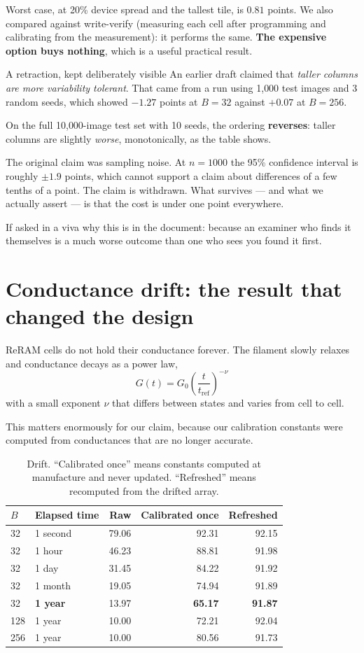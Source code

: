 \documentclass[11pt,a4paper]{report}
\begin{document}
Worst case, at 20\% device spread and the tallest tile, is $0.81$ points. We
also compared against write-verify (measuring each cell after programming and
calibrating from the measurement): it performs the same. \textbf{The expensive
option buys nothing}, which is a useful practical result.

\begin{warnbox}{A retraction, kept deliberately visible}
An earlier draft claimed that \emph{taller columns are more variability
tolerant}. That came from a run using 1{,}000 test images and 3 random seeds,
which showed $-1.27$ points at $B=32$ against $+0.07$ at $B=256$.

On the full 10{,}000-image test set with 10 seeds, the ordering \textbf{reverses}:
taller columns are slightly \emph{worse}, monotonically, as the table shows.

The original claim was sampling noise. At $n = 1000$ the 95\% confidence
interval is roughly $\pm1.9$ points, which cannot support a claim about
differences of a few tenths of a point. The claim is withdrawn. What survives
--- and what we actually assert --- is that the cost is under one point
everywhere.

If asked in a viva why this is in the document: because an examiner who finds
it themselves is a much worse outcome than one who sees you found it first.
\end{warnbox}

\section{Conductance drift: the result that changed the design}

ReRAM cells do not hold their conductance forever. The filament slowly relaxes
and conductance decays as a power law,
\[
G(t) = G_0 \left(\frac{t}{t_{\mathrm{ref}}}\right)^{-\nu}
\]
with a small exponent $\nu$ that differs between states and varies from cell
to cell.

This matters enormously for our claim, because our calibration constants were
computed from conductances that are no longer accurate.

\begin{table}[h]
\centering
\caption{Drift. ``Calibrated once'' means constants computed at manufacture and
never updated. ``Refreshed'' means recomputed from the drifted array.}
\begin{tabular}{llrrr}
\toprule
$B$ & Elapsed time & Raw & Calibrated once & Refreshed \\
\midrule
32  & 1 second & 79.06 & 92.31 & 92.15 \\
32  & 1 hour   & 46.23 & 88.81 & 91.98 \\
32  & 1 day    & 31.45 & 84.22 & 91.92 \\
32  & 1 month  & 19.05 & 74.94 & 91.89 \\
32  & \textbf{1 year} & 13.97 & \textbf{65.17} & \textbf{91.87} \\
\midrule
128 & 1 year & 10.00 & 72.21 & 92.04 \\
256 & 1 year & 10.00 & 80.56 & 91.73 \\
\bottomrule
\end{tabular}
\end{table}
\end{document}

